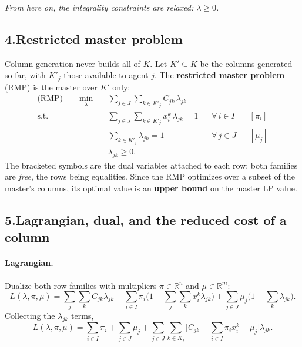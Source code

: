 \documentclass[11pt]{article}
\DeclareMathOperator*{\minimize}{min}
\theoremstyle{definition}
\theoremstyle{plain}
\begin{document}
\emph{From here on, the integrality constraints are relaxed:
$\lambda \ge 0$.}

\subsection*{4.\quad Restricted master problem}

Column generation never builds all of $K$. Let $K' \subseteq K$ be the
columns generated so far, with $K'_j$ those available to agent $j$. The
\textbf{restricted master problem} (RMP) is the master over $K'$ only:
\begin{align}
  \text{(RMP)} \qquad
  \minimize_{\lambda} \quad
    & \sum_{j \in J} \sum_{k \in K'_j} C_{jk}\, \lambda_{jk} \\
  \text{s.t.} \quad
    & \sum_{j \in J} \sum_{k \in K'_j} x^{k}_i\, \lambda_{jk} = 1
      && \forall\, i \in I && [\pi_i] \\
    & \sum_{k \in K'_j} \lambda_{jk} = 1
      && \forall\, j \in J && [\mu_j] \\
    & \lambda_{jk} \ge 0 .
\end{align}
The bracketed symbols are the dual variables attached to each row;
both families are \emph{free}, the rows being equalities. Since the RMP
optimizes over a subset of the master's columns, its optimal value is an
\textbf{upper bound} on the master LP value.

\subsection*{5.\quad Lagrangian, dual, and the reduced cost of a column}

\paragraph{Lagrangian.} Dualize both row families with multipliers
$\pi \in \mathbb{R}^n$ and $\mu \in \mathbb{R}^m$:
\[
  L(\lambda, \pi, \mu)
  = \sum_{j}\sum_{k} C_{jk}\lambda_{jk}
    + \sum_{i \in I} \pi_i \Big( 1 - \sum_j \sum_k x^k_i \lambda_{jk}
      \Big)
    + \sum_{j \in J} \mu_j \Big( 1 - \sum_k \lambda_{jk} \Big).
\]
Collecting the $\lambda_{jk}$ terms,
\[
  \boxed{\;
  L(\lambda,\pi,\mu)
  = \sum_{i \in I} \pi_i + \sum_{j \in J} \mu_j
    + \sum_{j \in J} \sum_{k \in K_j}
      \Big[ C_{jk} - \sum_{i \in I} \pi_i x^k_i - \mu_j \Big]
      \lambda_{jk} . \;}
\]
\end{document}
